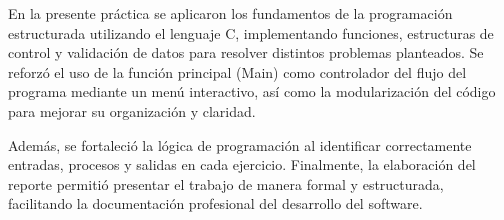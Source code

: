 \documentclass[12pt]{article}
\begin{document}
En la presente práctica se aplicaron los fundamentos de la programación estructurada
utilizando el lenguaje C, implementando funciones, estructuras de control y validación
de datos para resolver distintos problemas planteados. Se reforzó el uso de la función
principal (Main) como controlador del flujo del programa mediante un menú interactivo,
así como la modularización del código para mejorar su organización y claridad.

Además, se fortaleció la lógica de programación al identificar correctamente entradas,
procesos y salidas en cada ejercicio. Finalmente, la elaboración del reporte
permitió presentar el trabajo de manera formal y estructurada, facilitando la
documentación profesional del desarrollo del software.
\end{document}
